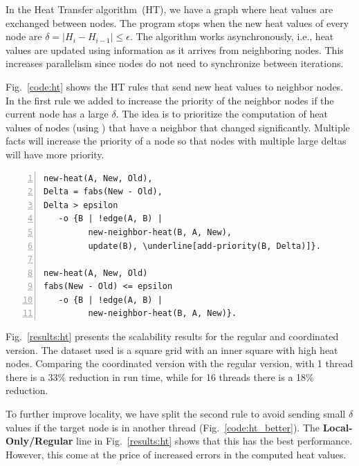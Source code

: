 In the Heat Transfer algorithm~(HT), we have a graph where heat values
are exchanged between nodes. The program stops when the new heat
values of every node are $\delta = |H_i - H_{i-1}| \le \epsilon$. The
algorithm works asynchronously, i.e., heat values are updated using
information as it arrives from neighboring nodes. This increases
parallelism since nodes do not need to synchronize between iterations.

Fig.~\ref{code:ht} shows the HT rules that send new heat values to
neighbor nodes. In the first rule we added  to increase the priority of the neighbor
nodes if the current node has a large $\delta$. The idea is to prioritize the
computation of heat values of nodes (using ) that have a neighbor
that changed significantly. Multiple  facts will
increase the priority of a node so that nodes with multiple large deltas will
have more priority.

\begin{topfig}
\scriptsize\begin{Verbatim}[numbers=left,commandchars=\\\[\]]
new-heat(A, New, Old),
Delta = fabs(New - Old),
Delta > epsilon
   -o {B | !edge(A, B) |
         new-neighbor-heat(B, A, New),
         update(B), \underline[add-priority(B, Delta)]}.

new-heat(A, New, Old)
fabs(New - Old) <= epsilon
   -o {B | !edge(A, B) |
         new-neighbor-heat(B, A, New)}.
\end{Verbatim}
\end{topfig}
\normalsize

Fig.~\ref{results:ht} presents the scalability results for the regular
and coordinated version. The dataset used is a square grid with an inner square
with high heat nodes. Comparing the coordinated version with the regular
version, with 1 thread there is a 33\% reduction in run time, while
for 16 threads there is a 18\% reduction.

To further improve locality, we have split the second rule to avoid sending
small $\delta$ values if the target node is in another thread
(Fig.~\ref{code:ht_better}). The \textbf{Local-Only/Regular} line
in Fig.~\ref{results:ht} shows that this has the best performance.  However, this
come at the price of increased errors in the computed heat values.

